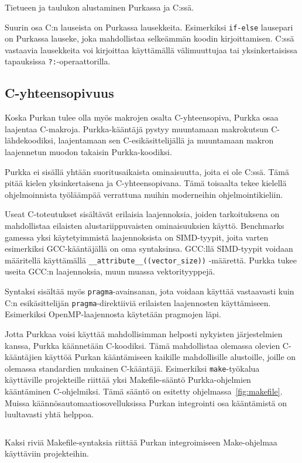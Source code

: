 \begin{listing}[ht!]
    \inputminted{Rust}{koodi/structinit.prk}
    \inputminted{C}{koodi/structinit.c}
    \caption{Tietueen ja taulukon alustaminen Purkassa ja C:ssä.}
    \label{fig:structinit}
\end{listing}

Suurin osa C:n lauseista on Purkassa lausekkeita. Esimerkiksi \texttt{if-else}
lausepari on Purkassa lauseke, joka mahdollistaa selkeämmän koodin
kirjoittamisen. C:ssä vastaavia lausekkeita voi kirjoittaa käyttämällä
välimuuttujaa tai yksinkertaisissa tapauksissa \texttt{?:}-operaattorilla.

\subsection{C-yhteensopivuus}

Koska Purkan tulee olla myös makrojen osalta C-yhteensopiva, Purkka osaa
laajentaa C-makroja. Purkka-kääntäjä pystyy muuntamaan makrokutsun
C-lähdekoodiksi, laajentamaan sen C-esikäsittelijällä ja muuntamaan makron
laajennetun muodon takaisin Purkka-koodiksi.


Purkka ei sisällä yhtään suoritusaikaista ominaisuutta, joita ei ole C:ssä.
Tämä pitää kielen yksinkertaisena ja C-yhteensopivana. Tämä toisaalta tekee
kielellä ohjelmoinnista työläämpää verrattuna muihin moderneihin
ohjelmointikieliin.

Useat C-toteutukset sisältävät erilaisia laajennoksia, joiden tarkoituksena on
mahdollistaa eilaisten alustariippuvaisten ominaisuuksien käyttö. Benchmarks
gamessa yksi käytetyimmistä laajennoksista on SIMD-tyypit, joita varten
esimerkiksi GCC-kääntäjällä on oma syntaksinsa. GCC:llä SIMD-tyypit voidaan
määritellä käyttämällä \texttt{\_\_attribute\_\_((vector\_size))} -määrettä.
Purkka tukee useita GCC:n laajennoksia, muun muassa vektorityyppejä.

Syntaksi sisältää myös \texttt{pragma}-avainsanan, jota voidaan käyttää
vastaavasti kuin C:n esikäsittelijän \texttt{pragma}-direktiiviä erilaisten
laajennosten käyttämiseen. Esimerkiksi OpenMP-laajennosta käytetään pragmojen
läpi.

Jotta Purkkaa voisi käyttää mahdollisimman helposti nykyisten järjestelmien
kanssa, Purkka käännetään C-koodiksi. Tämä mahdollistaa olemassa olevien
C-kääntäjien käyttöä Purkan kääntämiseen kaikille mahdollisille alustoille,
joille on olemassa standardien mukainen C-kääntäjä. Esimerkiksi
\texttt{make}-työkalua käyttäville projekteille riittää yksi Makefile-sääntö
Purkka-ohjelmien kääntäminen C-ohjelmiksi. Tämä sääntö on esitetty
ohjelmassa~\ref{fig:makefile}. Muissa käännösautomaatiosovelluksissa Purkan
integrointi osa kääntämistä on luultavasti yhtä helppoa.

\begin{listing}[ht!]
    \inputminted{Makefile}{koodi/Makefile.kieli}
    \caption{Kaksi riviä Makefile-syntaksia riittää Purkan integroimiseen
    Make-ohjelmaa käyttäviin projekteihin.}
    \label{fig:makefile}
\end{listing}
